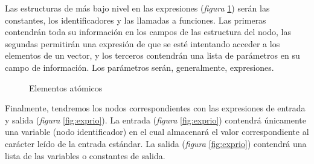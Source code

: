 \documentclass[a4paper,10pt]{article}
\begin{document}
Las estructuras de más bajo nivel en las expresiones (\emph{figura} \ref{fig:atom}) serán las constantes, los identificadores y las llamadas a funciones. Las primeras contendrán toda su información en los campos de las estructura del nodo, las segundas permitirán una expresión de que se esté intentando acceder a los elementos de un vector, y los terceros contendrán una lista de parámetros en su campo de información. Los parámetros serán, generalmente, expresiones.
\begin{figure}[H]
  \centering
  \caption{Elementos atómicos}
  \label{fig:atom}
\end{figure}

Finalmente, tendremos los nodos correspondientes con las expresiones de entrada y salida (\emph{figura} \ref{fig:exprio}). La entrada (\emph{figura} \ref{fig:exprio}) contendrá únicamente una variable (nodo identificador) en el cual almacenará el valor correspondiente al carácter leído de la entrada estándar. La salida (\emph{figura} \ref{fig:exprio}) contendrá una lista de las variables  o constantes de salida.
\end{document}
